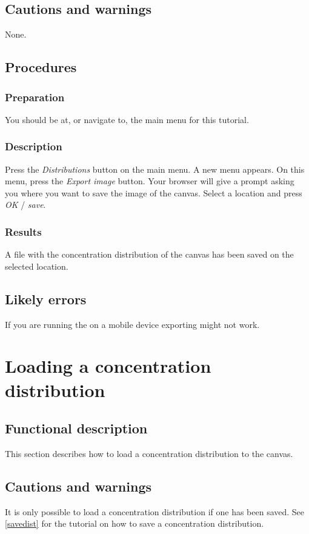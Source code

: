 \subsection{Cautions and warnings}
None.

\subsection{Procedures}
\subsubsection{Preparation}
You should be at, or navigate to, the main menu for this tutorial.

\subsubsection{Description}
Press the \emph{Distributions} button on the main menu. A new menu appears. On this menu, press the \emph{Export image} button.  Your browser will give a prompt asking you where you want to save the image of the canvas. Select a location and press \emph{OK} / \emph{save}.

\subsubsection{Results}
A file with the concentration distribution of the canvas has been saved on the selected location.

\subsection{Likely errors}
If you are running the \applicationname on a mobile device exporting might not work.


\section{Loading a concentration distribution}
\label{sec:loadDist}

\subsection{Functional description}
This section describes how to load a concentration distribution to the canvas.

\subsection{Cautions and warnings}
It is only possible to load a concentration distribution if one has been saved. See \ref{savedist} for the tutorial on how to save a concentration distribution.

